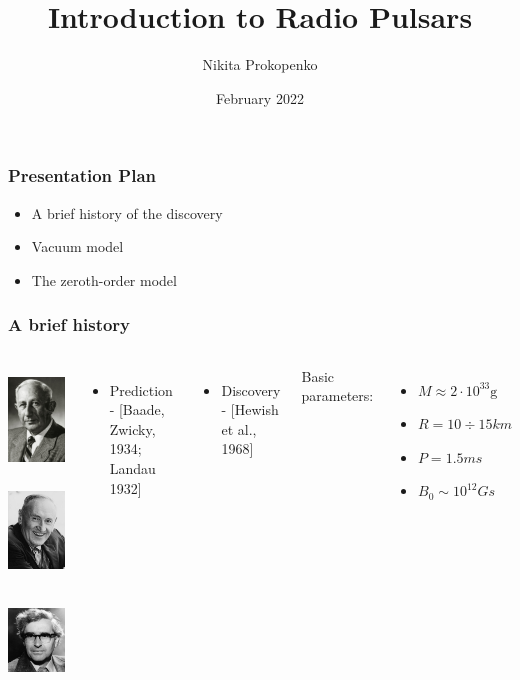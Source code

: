 \documentclass{beamer}
\title[Radio Pulsars]{\small Introduction to Radio Pulsars}
\author{Nikita Prokopenko}
\institute{MIPT}
\date[MIPT 2021] %
{February 2022}
\begin{document}
\frame{\titlepage}
\begin{frame}
\frametitle{Presentation Plan}

\begin{itemize}
\item A brief history of the discovery
\end{itemize}
\begin{itemize}
\item Vacuum model
\end{itemize}
\begin{itemize}
\item The zeroth-order model
\end{itemize}

\end{frame}

\begin{frame}
\frametitle{A brief history}
\begin{columns}
 
\includegraphics[width=.32\textwidth,height=2.8cm]{Walter-Baade_Astronom.jpg}\hfill%
\includegraphics[width=.32\textwidth,height=2.8cm]{Zwicky.jpg}\hfill%
\includegraphics[width=.32\textwidth,height=2.8cm]{d41586-021-02617-0_19678262.jpg}\\

\begin{itemize}
\item Prediction - [Baade, Zwicky, 1934; Landau 1932]
\end{itemize}
\begin{itemize}
\item Discovery - [Hewish et al., 1968]   \end{itemize}
Basic parameters:
\begin{itemize}
\item $M \approx 2 \cdot 10^{33} \text{g}$ 
\item $R = 10 \div 15 km$
\item $P = 1.5 ms$
\item $B_0 \sim 10^{12} Gs$
\end{itemize}

 
\end{columns}

\end{frame}
\end{document}
